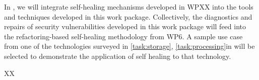 \begin{Workpackage}{\thewpno}
\begin{Task}
  \TaskResults{%
  }
  \TaskHeader{}
 \end{Task}

 \begin{Task}
  
  \TaskResults{%
  }
  \TaskHeader{}
 \end{Task}

 \begin{Task}
  
  \TaskResults{%
  }
  \TaskHeader{}
  In \theTask, we will integrate self-healing mechanisms developed in WPXX into the tools and techniques developed in this work package. Collectively, the diagnostics and repairs of security vulnerabilities developed in this work package will feed into the refactoring-based self-healing methodology from WP6. A sample use case from one of the technologies surveyed in \ref{task:storage}, \ref{task:processing}in  will be selected to demonstrate the application of self healing to that technology. 
 \end{Task}

\begin{WPDeliverables}
  \begin{compactitem}
    \item XX
\end{compactitem}
\end{WPDeliverables}
\end{Workpackage}
